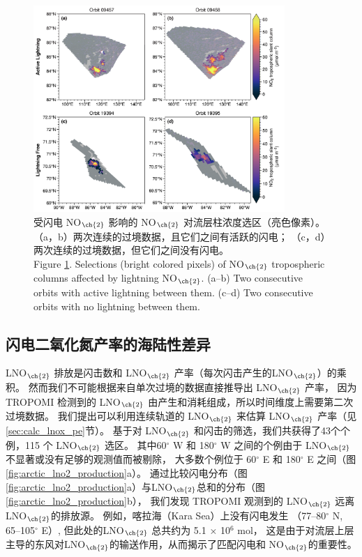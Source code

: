 \begin{figure}[H]
\centering
\includegraphics[width=0.85\textwidth]{./figures/arctic_consecutive_orbits.png}
\caption{
受闪电 NO$_{\ch{2}}$ 影响的 NO$_{\ch{2}}$ 对流层柱浓度选区（亮色像素）。
（a，b）两次连续的过境数据，且它们之间有活跃的闪电；
（c，d）两次连续的过境数据，但它们之间没有闪电。\\
Figure \ref{fig:consecutive_orbits}.
Selections (bright colored pixels) of NO$_{\ch{2}}$ tropospheric columns affected by lightning NO$_{\ch{2}}$.
(a--b) Two consecutive orbits with active lightning between them.
(c--d) Two consecutive orbits with no lightning between them.
}
\label{fig:consecutive_orbits}
\end{figure}


\subsection{闪电二氧化氮产率的海陆性差异}


LNO$_{\ch{2}}$ 排放是闪击数和 LNO$_{\ch{2}}$ 产率（每次闪击产生的LNO$_{\ch{2}}$）的乘积。
然而我们不可能根据来自单次过境的数据直接推导出 LNO$_{\ch{2}}$ 产率，
因为 TROPOMI 检测到的 LNO$_{\ch{2}}$ 由产生和消耗组成，所以时间维度上需要第二次过境数据。
我们提出可以利用连续轨道的 LNO$_{\ch{2}}$ 来估算 LNO$_{\ch{2}}$ 产率（见\ref{sec:calc_lnox_pe}节）。
基于对 LNO$_{\ch{2}}$ 和闪击的筛选，我们共获得了43个个例，115 个 LNO$_{\ch{2}}$ 选区。
其中60$^{\circ}$ W 和 180$^{\circ}$ W 之间的个例由于 LNO$_{\ch{2}}$ 不显著或没有足够的观测值而被剔除，
大多数个例位于 60$^{\circ}$ E 和 180$^{\circ}$ E 之间（图 \ref{fig:arctic_lno2_production}a）。
通过比较闪电分布（图 \ref{fig:arctic_lno2_production}a）与LNO$_{\ch{2}}$总和的分布（图 \ref{fig:arctic_lno2_production}b），
我们发现 TROPOMI 观测到的 LNO$_{\ch{2}}$ 远离LNO$_{\ch{2}}$的排放源。
例如，喀拉海（Kara Sea）上没有闪电发生 （77--80$^{\circ}$ N, 65--105$^{\circ}$ E）,
但此处的LNO$_{\ch{2}}$ 总共约为 5.1 $\times$ 10$^6$ mol，
这是由于对流层上层主导的东风对LNO$_{\ch{2}}$的输送作用，从而揭示了匹配闪电和 NO$_{\ch{2}}$的重要性。


